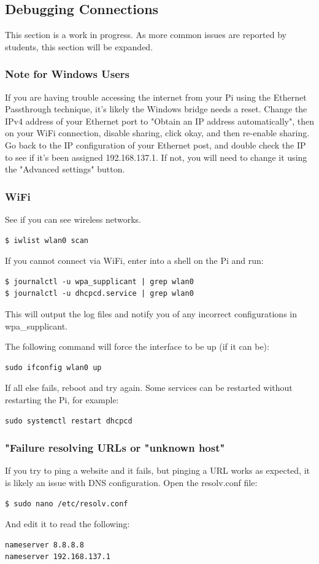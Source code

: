 \subsection{Debugging Connections}
This section is a work in progress. As more common issues are reported by students, this section will be expanded.

\subsubsection{Note for Windows Users}
If you are having trouble accessing the internet from your Pi using the Ethernet Passthrough technique, it's likely the Windows bridge needs a reset. Change the IPv4 address of your Ethernet port to "Obtain an IP address automatically", then on your WiFi connection, disable sharing, click okay, and then re-enable sharing. Go back to the IP configuration of your Ethernet post, and double check the IP to see if it's been assigned 192.168.137.1. If not, you will need to change it using the "Advanced settings" button.

\subsubsection{WiFi}
See if you can see wireless networks.
\begin{lstlisting}
$ iwlist wlan0 scan
\end{lstlisting}

If you cannot connect via WiFi, enter into a shell on the Pi and run:
\begin{lstlisting}
$ journalctl -u wpa_supplicant | grep wlan0
$ journalctl -u dhcpcd.service | grep wlan0
\end{lstlisting}
This will output the log files and notify you of any incorrect configurations in wpa\_supplicant.

The following command will force the interface to be up (if it can be):
\begin{lstlisting}
sudo ifconfig wlan0 up
\end{lstlisting}

If all else fails, reboot and try again. Some services can be restarted without restarting the Pi, for example:
\begin{lstlisting}
sudo systemctl restart dhcpcd
\end{lstlisting}

\subsubsection{"Failure resolving URLs or "unknown host"}
If you try to ping a website and it fails, but pinging a URL works as expected, it is likely an issue with DNS configuration. Open the resolv.conf file:
\begin{lstlisting}
$ sudo nano /etc/resolv.conf
\end{lstlisting}
And edit it to read the following:
\begin{lstlisting}
nameserver 8.8.8.8
nameserver 192.168.137.1
\end{lstlisting}

